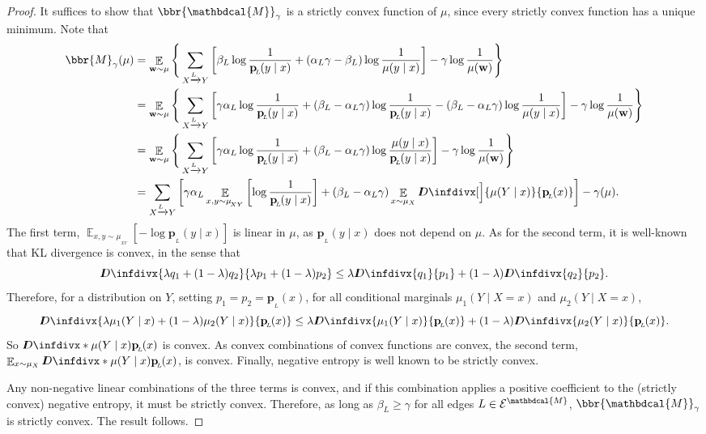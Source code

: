\documentclass[letterpaper]{article} %
\theoremstyle{plain}
\theoremstyle{definition}
\theoremstyle{remark}
\let\H\relax
\DeclareMathOperator{\H}{\mathrm{H}} %
\DeclareMathOperator*{\Ex}{\mathbb{E}} %
\newcommand\mat[1]{\mathbf{#1}}
\newcommand{\thickD}{I\mkern-8muD}
\newcommand{\kldiv}{\thickD\infdivx}
\newcommand{\bp}[1][L]{\mat{p}_{\!_{#1}\!}}
\newcommand{\Ed}{\mathcal E}
\newcommand{\dg}[1]{\mathbdcal{#1}}
\begin{document}
\begin{proof}
It suffices to show that $\bbr{\dg
			  M}_\gamma$ is a strictly convex function of $\mu$,
since every strictly convex function has a unique minimum.
Note that
\begin{align*}
\bbr{M}_\gamma(\mu) 
	&= \Ex_{\mat w \sim \mu} \Bigg\{   \sum_{ X \xrightarrow{\!\!L} Y  } \left[
		\beta_L \log \frac{1}{\bp(y\mid x)} + ({\alpha_L}\gamma - \beta_L ) \log \frac{1}{\mu(y \mid x)} \right] - \gamma \log \frac{1}{\mu(\mat w)} \Bigg\} \\
	&= \Ex_{\mat w \sim \mu} \Bigg\{   \sum_{ X \xrightarrow{\!\!L} Y  } \left[ \gamma {\alpha_L} \log \frac{1}{\bp(y\mid x)} + 
		(\beta_L - {\alpha_L} \gamma) \log \frac{1}{\bp(y\mid x)} - (\beta_L - {\alpha_L} \gamma) \log \frac{1}{\mu(y \mid x)} \right] - \gamma \log \frac{1}{\mu(\mat w)} \Bigg\}  \\
	&= \Ex_{\mat w \sim \mu} \Bigg\{   \sum_{ X \xrightarrow{\!\!L} Y  } \left[ \gamma {\alpha_L} \log \frac{1}{\bp(y\mid x)} + 
		(\beta_L - {\alpha_L} \gamma) \log \frac{\mu(y\mid x)}{\bp(y\mid x)} \right] - \gamma \log \frac{1}{\mu(\mat w)} \Bigg\} \\
	&=  \sum_{ X \xrightarrow{\!\!L} Y  } \left[ \gamma {\alpha_L} \Ex_{x,y \sim \mu_{\!_{XY}}} \left[ \log \frac{1}{\bp(y\mid x)} \right] + 
		(\beta_L - {\alpha_L} \gamma) \Ex_{x\sim\mu_X}
          \kldiv[\Big]{\mu(Y\mid x)}{\bp( x)} \right] - \gamma \H(\mu). 
\end{align*}
	The first term, 
	\( \Ex_{x,y \sim \mu_{\!_{XY}}} \left[-\log {\bp(y\mid x)}\right] \) 
	is linear in $\mu$, as $\bp(y\mid x)$ does not depend on $\mu$. %
As for the second term, it is well-known that KL divergence is convex, in the sense that 
	\[ \kldiv{\lambda q_1 + (1-\lambda) q_2 }{ \lambda p_1 +
          (1-\lambda) p_2} \leq \lambda \kldiv {q_1}{ p_1} +
                (1-\lambda) \kldiv{q_2}{p_2}. \] 
	Therefore, for a distribution on $Y$, setting $p_1 =
 p_2 = \bp(x)$, for all conditional marginals $\mu_1(Y \mid X=x)$ and
			$\mu_2(Y\mid X=x)$,
	\[ \kldiv{\lambda \mu_1(Y\mid x) + (1-\lambda)
			  \mu_2(Y\mid x) }{ \bp(x) } \leq \lambda \kldiv
			   {\mu_1(Y\mid x)}{\bp(x)} + (1-\lambda)
								  \kldiv{\mu_2(Y\mid x)}{\bp(x)}. \] 
	So $\kldiv*{\mu(Y\mid x)}{\bp( x)}$ is convex. As
			convex combinations of convex functions are convex,
			the second term, $\Ex_{x\sim\mu_X}\kldiv*{\mu(Y\mid
			  x)}{\bp( x)}$, is convex.
Finally, negative entropy is well known to be strictly convex.                

			Any non-negative linear combinations of the three
			terms is convex, and if this combination applies a
			positive coefficient to the (strictly convex) negative entropy,
			it must be strictly convex. Therefore, as
			long as $\beta_L \geq \gamma$ for all edges $L \in
			\Ed^{\dg M}$, $\bbr{\dg M}_\gamma$ is
strictly convex.  The result follows.
\end{proof}
\end{document}
